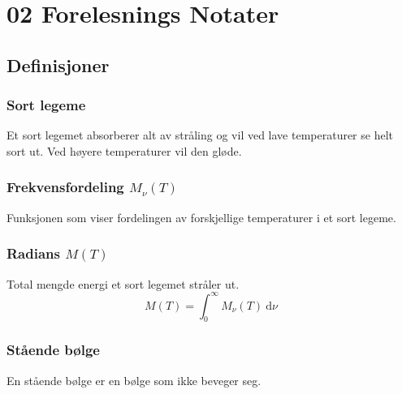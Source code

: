 \section{02 Forelesnings Notater}
\subsection{Definisjoner}
\subsubsection{Sort legeme}    
Et sort legemet absorberer alt av stråling og vil ved lave temperaturer se helt sort ut. Ved høyere temperaturer vil den gløde. 

\subsubsection{Frekvensfordeling $M_{ν}(T)$}
Funksjonen som viser fordelingen av forskjellige temperaturer i et sort legeme. 

\subsubsection{Radians $M(T)$}
Total mengde energi et sort legemet stråler ut. 
\begin{equation}
M(T) = \int_{0}^{∞} M_{ν}(T) \ \mathrm{d}ν
\end{equation}

\subsubsection{Stående bølge}
En stående bølge er en bølge som ikke beveger seg. 
